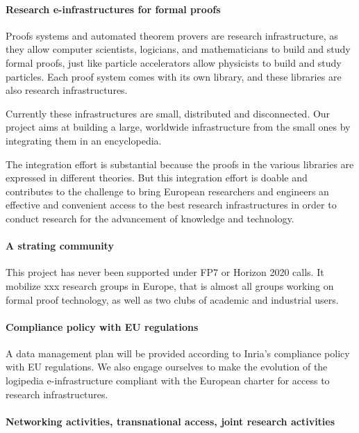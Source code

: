 \paragraph{Research e-infrastructures for formal proofs}

Proofs systems and automated theorem provers are research
infrastructure, as they allow computer scientists, logicians, and
mathematicians to build and study formal proofs, just like particle
accelerators allow physicists to build and study particles. Each proof
system comes with its own library, and these libraries are also
research infrastructures.

Currently these infrastructures are small, distributed and
disconnected.  Our project aims at building a large, worldwide
infrastructure from the small ones by integrating them in an
encyclopedia.

The integration effort is substantial because the proofs in the
various libraries are expressed in different theories. But this
integration effort is doable and contributes to the challenge to bring
European researchers and engineers an effective and convenient access
to the best research infrastructures in order to conduct research for
the advancement of knowledge and technology.

\paragraph{A strating community}

This project has never been supported under FP7 or Horizon 2020 calls.
It mobilize xxx research groups in Europe, that is almost all groups
working on formal proof technology, as well as two clubs of academic
and industrial users.

\paragraph{Compliance policy with EU regulations}

A data management plan will be provided according to Inria’s
compliance policy with EU regulations. We also engage ourselves to
make the evolution of the logipedia e-infrastructure compliant with
the European charter for access to research infrastructures.

\paragraph{Networking activities, transnational access, joint research activities}

